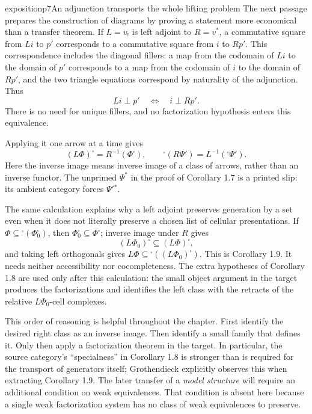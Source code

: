 \begin{dcomment}{exposition}{p7}{An adjunction transports the whole lifting problem}
The next passage prepares the construction of diagrams by proving a statement more economical than a transfer theorem. If $L=v_!$ is left adjoint to $R=v^*$, a commutative square from $Li$ to $p'$ corresponds to a commutative square from $i$ to $Rp'$. This correspondence includes the diagonal fillers: a map from the codomain of $Li$ to the domain of $p'$ corresponds to a map from the codomain of $i$ to the domain of $Rp'$, and the two triangle equations correspond by naturality of the adjunction. Thus
\[
 Li\perp p'\quad\Longleftrightarrow\quad i\perp Rp'.
\]
There is no need for unique fillers, and no factorization hypothesis enters this equivalence.

Applying it one arrow at a time gives
\[
 (L\Phi)^{\square}=R^{-1}(\Phi^{\square}),\qquad
 {}^{\square}(R\Psi')=L^{-1}({}^{\square}\Psi').
\]
Here the inverse image means inverse image of a class of arrows, rather than an inverse functor. The unprimed $\Psi^*$ in the proof of Corollary 1.7 is a printed slip: its ambient category forces $\Psi'{}^*$.

The same calculation explains why a left adjoint preserves generation by a set even when it does not literally preserve a chosen list of cellular presentations. If $\Phi\subseteq{}^{\square}(\Phi_0^{\square})$, then $\Phi_0^{\square}\subseteq\Phi^{\square}$; inverse image under $R$ gives
\[
 (L\Phi_0)^{\square}\subseteq(L\Phi)^{\square},
\]
and taking left orthogonals gives $L\Phi\subseteq{}^{\square}((L\Phi_0)^{\square})$. This is Corollary 1.9. It needs neither accessibility nor cocompleteness. The extra hypotheses of Corollary 1.8 are used only after this calculation: the small object argument in the target produces the factorizations and identifies the left class with the retracts of the relative $L\Phi_0$-cell complexes.

This order of reasoning is helpful throughout the chapter. First identify the desired right class as an inverse image. Then identify a small family that defines it. Only then apply a factorization theorem in the target. In particular, the source category's ``specialness'' in Corollary 1.8 is stronger than is required for the transport of generators itself; Grothendieck explicitly observes this when extracting Corollary 1.9. The later transfer of a \emph{model structure} will require an additional condition on weak equivalences. That condition is absent here because a single weak factorization system has no class of weak equivalences to preserve.
\end{dcomment}

